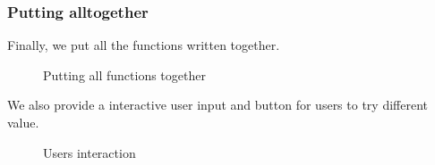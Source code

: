 \documentclass{article}
\begin{document}
\begin{normalsize}
\subsubsection{Putting alltogether}
Finally, we put all the functions written together. 
\begin{figure}[H]
	\caption{Putting all functions together}
\end{figure}
We also provide a interactive user input and button for users to try different value.
\begin{figure}[H]
	\caption{Users interaction}
\end{figure}
\newpage

\end{normalsize}
\end{document}
